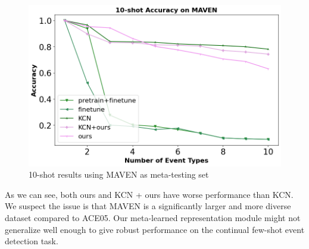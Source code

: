 \begin{figure}[h]
\centering
    \includegraphics[scale=0.28]{imgs/ACE_MAVEN.jpg}
    \caption{10-shot results using MAVEN as meta-testing set}
    \label{img:result_MAVEN}
\end{figure}

As we can see,  both ours and KCN + ours have worse performance than KCN.  We suspect the issue is that MAVEN is a significantly larger and more diverse dataset compared to ACE05. Our meta-learned representation module might not generalize well enough to give robust performance on the continual few-shot event detection task.
